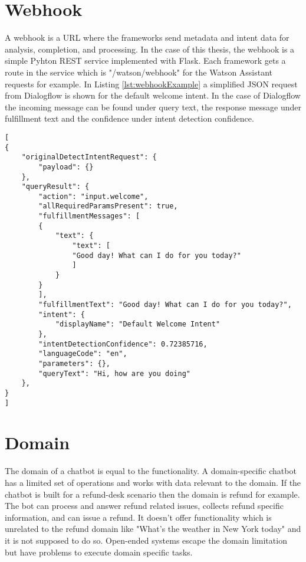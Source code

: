 \section{Webhook} \label{sec:webhook}
A webhook is a URL where the frameworks send metadata and intent data for analysis, completion, and processing.
In the case of this thesis, the webhook is a simple Pyhton REST service implemented with Flask.
Each framework gets a route in the service which is "/watson/webhook" for the Watson Assistant requests for example.
In Listing \ref{lst:webhookExample} a simplified JSON request from Dialogflow is shown for the default welcome intent.
In the case of Dialogflow the incoming message can be found under query text, the response message under fulfillment text and the confidence under intent detection confidence. 
\begin{lstlisting}[caption={Dialogflow Webhook Request Example}, label={lst:webhookExample},captionpos=b,frame=single,language={[Sharp]C},commentstyle=\color{mygreen},keywordstyle=\color{blue},
morekeywords={}]                
[
{
    "originalDetectIntentRequest": {
        "payload": {}
    },
    "queryResult": {
        "action": "input.welcome",
        "allRequiredParamsPresent": true,
        "fulfillmentMessages": [
        {
            "text": {
                "text": [
                "Good day! What can I do for you today?"
                ]
            }
        }
        ],
        "fulfillmentText": "Good day! What can I do for you today?",
        "intent": {
            "displayName": "Default Welcome Intent"
        },
        "intentDetectionConfidence": 0.72385716,
        "languageCode": "en",
        "parameters": {},
        "queryText": "Hi, how are you doing"
    },
}
]\end{lstlisting}  


\section{Domain}
The domain of a chatbot is equal to the functionality.
A domain-specific chatbot has a limited set of operations and works with data relevant to the domain.
If the chatbot is built for a refund-desk scenario then the domain is refund for example.
The bot can process and answer refund related issues, collects refund specific information,
and can issue a refund. It doesn't offer functionality which is unrelated to the refund domain like 
"What's the weather in New York today" and it is not supposed to do so.
Open-ended systems escape the domain limitation but have problems to execute domain specific tasks. 

